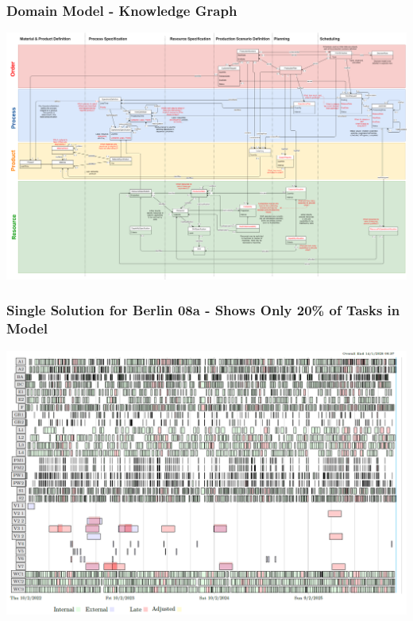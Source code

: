 \documentclass[dvipsnames,aspectratio=169]{beamer}
\begin{document}
\begin{frame}
\begin{columns}
\begin{column}{0.5\textwidth}
\end{column}
\end{columns}
\end{frame}

\begin{frame}
\frametitle{Domain Model - Knowledge Graph}
\includegraphics[width=.8\textwidth]{images/DomainModel}
\end{frame}

\begin{frame}
\frametitle{Single Solution for Berlin 08a - Shows Only 20\% of Tasks in Model}
\includegraphics[width=.75\textwidth]{images/solution08apref2}
\end{frame}
\end{document}
